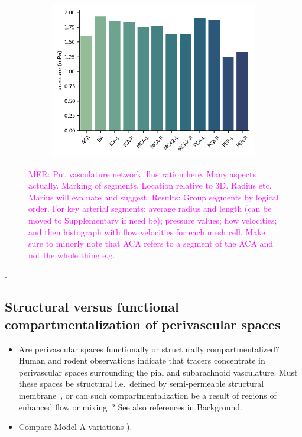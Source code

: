\documentclass[fleqn,10pt]{wlscirep}
\newcommand{\mer}[1]{\textcolor{magenta}{#1}}
\begin{document}
\begin{figure}
\begin{subfigure}[b]{0.33\textwidth}
    \includegraphics[width =  \linewidth]{figures/sas_flow_arteries_labels_pressure.png}
    \end{subfigure}
    \label{fig:pvs}
    \caption{\mer{MER: Put vasculature network illustration here. Many aspects actually. Marking of segments. Location relative to 3D. Radius etc. Marius will evaluate and suggest. Results: Group segments by logical order. For key arterial segments: average radius and length (can be moved to Supplementary if need be); pressure values; flow velocities; and then histograph with flow velocities for each mesh cell. Make sure to minorly note that ACA refers to a segment of the ACA and not the whole thing e.g.}}
\end{figure}

.

\subsection*{Structural versus functional compartmentalization of perivascular spaces}

\begin{itemize}
\item
  Are perivascular spaces functionally or structurally
  compartmentalized? Human and rodent observations indicate that
  tracers concentrate in perivascular spaces surrounding the pial and
  subarachnoid vasculature. Must these spaces be structural
  i.e.~defined by semi-permeable structural
  membrane~\cite{zhang1990interrelationships, zhang1992directional,
    mestre2018flow, eide2024functional}, or can such
  compartmentalization be a result of regions of enhanced flow or
  mixing~\cite{bedussi2017paravascular, vinje2021brain}? See also
  references in Background.
\item
  Compare Model A variations ).
\end{itemize}
\end{document}
